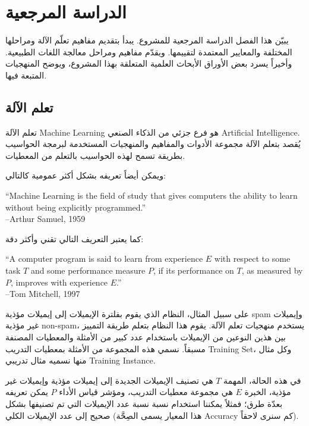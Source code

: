 


\chapter{الدراسة المرجعية}
يبيّن هذا الفصل الدراسة المرجعية للمشروع.
يبدأ بتقديم مفاهيم تعلّم الآلة ومراحلها المختلفة والمعايير المعتمدة لتقييمها.
ويقدّم مفاهيم ومراحل معالجة اللغات الطبيعية.
وأخيراً يسرد بعض الأوراق الأبحاث العلمية المتعلقة بهذا المشروع، ويوضح المنهجيات المتبعة فيها.







\section{تعلم الآلة}
تعلم الآلة \textenglish{Machine Learning} هو فرع جزئي من الذكاء الصنعي \textenglish{Artificial Intelligence}.
يُقصد بتعلم الآلة مجموعة الأدوات والمفاهيم والمنهجيات المستخدمة لبرمجة الحواسيب
بطريقة تسمح لهذه الحواسيب بالتعلم من المعطيات.

ويمكن أيضاً تعريفه بشكل أكثر عمومية كالتالي:

\begin{english}
	``Machine Learning is the field of study that gives computers the ability to learn
	without being explicitly programmed.'' \\
	--Arthur Samuel, 1959
\end{english}

كما يعتبر التعريف التالي تقني وأكثر دقة:

\begin{english}
	``A computer program is said to learn from experience $E$ with respect to some task $T$
	and some performance measure $P$, if its performance on $T$, as measured by $P$, improves
	with experience $E$.'' \\
	--Tom Mitchell, 1997
\end{english}

على سبيل المثال، النظام الذي يقوم بفلترة الإيميلات إلى إيميلات مؤذية \textenglish{spam} وإيميلات غير مؤذية \textenglish{non-spam}، يستخدم منهجيات تعلم الآلة.
يقوم هذا النظام بتعلم طريقة التمييز بين هذين النوعين من الإيميلات باستخدام عدد كبير من الأمثلة والمعطيات المصنفة مسبقاً.
نسمي هذه المجموعة من الأمثلة بمعطيات التدريب \textenglish{Training Set}، وكل مثال منها نسميه مثال تدريبي \textenglish{Training Instance}.

في هذه الحالة، المهمة $T$ هي تصنيف الإيميلات الجديدة إلى إيميلات مؤذية وإيميلات غير مؤذية، الخبرة $E$ هي مجموعة معطيات التدريب،
ومؤشر قياس الأداء $P$ يمكن تعريفه بعدّة طرق؛ فمثلاً يمكننا استخدام نسبة نسبة عدد الإيميلات التي تم تصنيفها بشكل صحيح إلى عدد الإيميلات الكلي
(هذا المعيار يسمى الصِحَّة \textenglish{Accuracy} كم سنرى لاحقاً).


